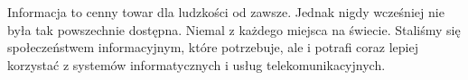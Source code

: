 \label{chapter:rozdzialdrugi}
Informacja to cenny towar dla ludzkości od zawsze. Jednak nigdy wcześniej nie była tak powszechnie dostępna. Niemal z każdego miejsca na świecie. Staliśmy się społeczeństwem informacyjnym, które potrzebuje, ale i potrafi coraz lepiej korzystać z systemów informatycznych i usług telekomunikacyjnych.